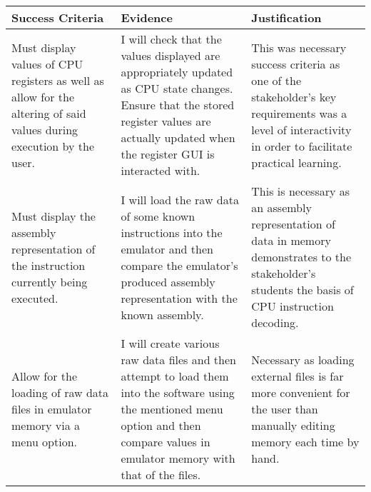         \begin{tabular} { | m{} | m{} | m{} | }
            \hline
            \textbf{Success Criteria} & \textbf{Evidence} & \textbf{Justification} \\
            \hline
            Must display values of CPU registers as well as allow for the altering of said values during execution by the user. &
            I will check that the values displayed are appropriately updated as CPU state changes. Ensure that the stored register values are actually updated when the register GUI is interacted with. &
            This was necessary success criteria as one of the stakeholder's key requirements was a level of interactivity in order to facilitate practical learning. \\
            \hline
            Must display the assembly representation of the instruction currently being executed. &
            I will load the raw data of some known instructions into the emulator and then compare the emulator's produced assembly representation with the known assembly. &
            This is necessary as an assembly representation of data in memory demonstrates to the stakeholder's students the basis of CPU instruction decoding. \\
            \hline
            Allow for the loading of raw data files in emulator memory via a menu option. &
            I will create various raw data files and then attempt to load them into the software using the mentioned menu option and then compare values in emulator memory with that of the files. &
            Necessary as loading external files is far more convenient for the user than manually editing memory each time by hand. \\
            \hline
        \end{tabular}


